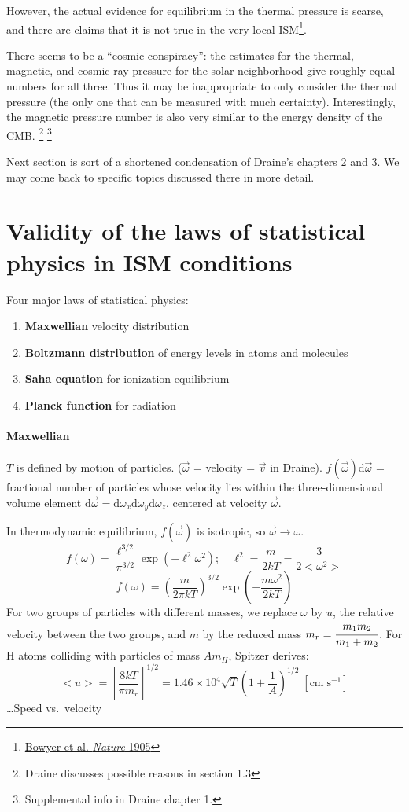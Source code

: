 \documentclass[12pt]{article}
\begin{document}
However, the actual evidence for equilibrium in the thermal pressure
is scarse, and there are claims that it is not true in the very local
ISM\footnote{\href{http://www.nature.com/nature/journal/v375/n6528/abs/375212a0.html}
{Bowyer et al. \textit{Nature} 1905}}.

There seems to be a ``cosmic conspiracy'': the estimates for the
thermal, magnetic, and cosmic ray pressure for the solar neighborhood
give roughly equal numbers for all three. Thus it may be inappropriate
to only consider the thermal pressure (the only one that can be
measured with much certainty). Interestingly, the magnetic pressure
number is also very similar to the energy density of the CMB\@.
\footnote{Draine discusses possible reasons in section 1.3}
\footnote{Supplemental info in Draine chapter 1.}

Next section is sort of a shortened condensation of Draine's chapters
2 and 3. We may come back to specific topics discussed there in more
detail.
\section{Validity of the laws of statistical physics in ISM conditions}
Four major laws of statistical physics:
\begin{enumerate}
    \item \textbf{Maxwellian} velocity distribution
    \item \textbf{Boltzmann distribution} of energy levels in atoms and molecules
    \item \textbf{Saha equation} for ionization equilibrium
    \item \textbf{Planck function} for radiation
\end{enumerate}

\paragraph{Maxwellian} $T$ is defined by motion of particles.
($\vec{\omega}$ = velocity = $\vec{v}$ in Draine).
$f(\vec{\omega})\mathrm{d}\vec{\omega}$ = fractional number of
particles whose velocity lies within the three-dimensional volume element
$\mathrm{d}\vec{\omega} =
\mathrm{d}\omega_{x}\mathrm{d}\omega_{y}\mathrm{d}\omega_{z}$,
centered at velocity $\vec{\omega}$.

In thermodynamic equilibrium, $f(\vec{\omega})$ is isotropic, so
$\vec{\omega} \rightarrow \omega$.
$${ f(\omega) =
    \frac{\ell^{3/2}}{\pi^{3/2}}\exp(-\ell^{2}\omega^{2});\quad
    \ell^{2} = \frac{m}{2kT} = \frac{3}{2<\omega^{2}>}
}$$ $${
    f(\omega) = \left(\frac{m}{2\pi kT}\right)^{3/2}
    \exp\left(-\frac{m\omega^{2}}{2kT}\right)
}$$
For two groups of particles with different masses, we replace $\omega$
by $u$, the relative velocity between the two groups, and $m$ by the
reduced mass $m_{r} = \cfrac{m_{1}m_{2}}{m_{1}+m_{2}}$.
For H atoms colliding with particles of mass $Am_{H}$,
Spitzer derives:$${
    <u> = \left[\frac{8kT}{\pi m_{r}}\right]^{1/2}
    = 1.46\times10^{4}\sqrt{T}\left(1+\frac{1}{A}\right)^{1/2}\;
    [\mathrm{cm\; s}^{-1}]
}$$
\ldots Speed vs.\ velocity
\end{document}
